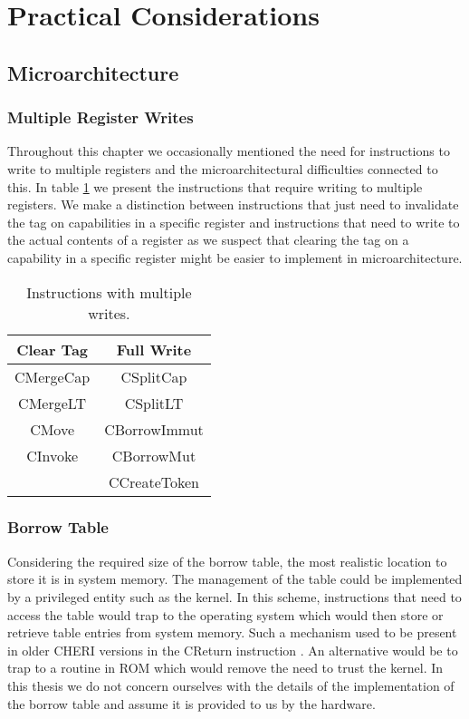 \section{Practical Considerations}
\subsection{Microarchitecture}
\subsubsection{Multiple Register Writes}
Throughout this chapter we occasionally mentioned the need for instructions to write to multiple registers and the microarchitectural difficulties connected to this. In table \ref{table:multiplewrites} we present the instructions that require writing to multiple registers. We make a distinction between instructions that just need to invalidate the tag on capabilities in a specific register and instructions that need to write to the actual contents of a register as we suspect that clearing the tag on a capability in a specific register might be easier to implement in microarchitecture.
\begin{table}[h]
\centering
\begin{tabular}{| c | c |}
\hline
Clear Tag & Full Write \\
\hline
 CMergeCap & CSplitCap \\
 CMergeLT & CSplitLT \\
 CMove & CBorrowImmut \\
 CInvoke & CBorrowMut \\
 & CCreateToken \\
\hline
\end{tabular}
\caption{Instructions with multiple writes.}
\label{table:multiplewrites}
\end{table}

\subsubsection{Borrow Table}
\label{sec:microarchbt}
Considering the required size of the borrow table, the most realistic location to store it is in system memory. The management of the table could be implemented by a privileged entity such as the kernel. In this scheme, instructions that need to access the table would trap to the operating system which would then store or retrieve table entries from system memory.
Such a mechanism used to be present in older CHERI versions in the CReturn instruction \cite{7723791}.
An alternative would be to trap to a routine in ROM which would remove the need to trust the kernel.
In this thesis we do not concern ourselves with the details of the implementation of the borrow table and assume it is provided to us by the hardware.

